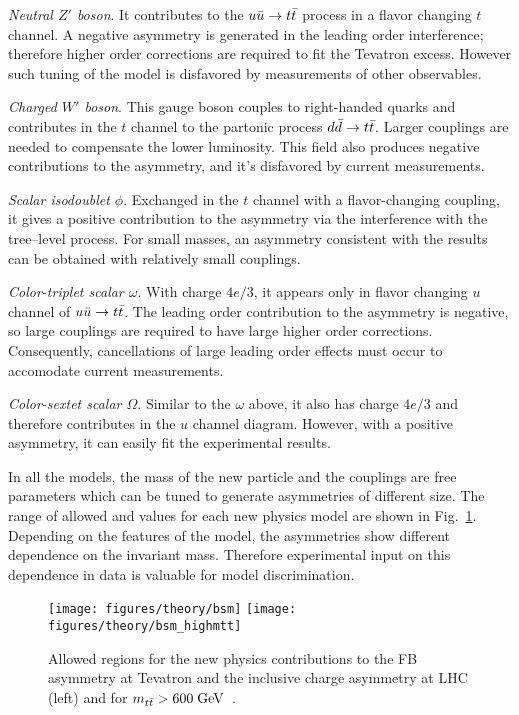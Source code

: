 {\em Neutral $Z'$ boson}. It contributes to the $u\bar{u}{}\to t\bar{t}{}$
process in a flavor changing $t$ channel. A negative asymmetry
is generated in the leading order interference; therefore higher order
corrections are required to fit the Tevatron excess. However such
tuning of the model is disfavored by measurements of other observables.

{\em Charged $W'$ boson}. This gauge boson couples to right-handed
quarks and contributes in the $t$ channel to the partonic process
$d\bar{d}{}\to t\bar{t}{}$. Larger couplings are needed to compensate the
lower \ddbar{} luminosity. This field also produces negative
contributions to the asymmetry, and it's disfavored by current measurements.

{\em Scalar isodoublet $\phi$}.
Exchanged in the $t$ channel with a flavor-changing coupling, it gives
a positive contribution to the asymmetry via the interference with the
tree--level process. For small masses, an asymmetry consistent with the
\afb{} results can be obtained with relatively small couplings.

{\em Color-triplet scalar $\omega$}.
With charge $4e/3$, it appears only in flavor changing $u$ channel of
$u\bar{u}{}\to t\bar{t}{}$. The leading order contribution to the asymmetry
is negative, so large couplings are required to have large higher
order corrections. Consequently, cancellations of large leading order
effects must occur to accomodate current measurements.

{\em Color-sextet scalar $\Omega$}.
Similar to the $\omega$ above, it also has charge $4e/3$ and therefore
contributes in the $u$ channel diagram. However, with a positive
asymmetry, it can easily fit the experimental results.

In all the models, the mass of the new particle and the couplings are
free parameters which can be tuned to generate asymmetries of
different size. The range of allowed \ac{} and \afb{} values for each
new physics model are shown in Fig.~\ref{fig:bsmmodels}. Depending on
the features of the model, the asymmetries show different dependence
on the \ttbar{} invariant mass. Therefore experimental input on this
dependence in data is valuable for model discrimination. 

\begin{figure}[!htb]
  \centering
  \texttt{[image: figures/theory/bsm]} 
  \texttt{[image: figures/theory/bsm\_highmtt]} 
  \caption{Allowed regions for the new physics contributions to the FB
    asymmetry at Tevatron and the inclusive charge asymmetry at LHC
    (left) and for $m_{t\bar{t}}{}>600 \; \mathrm{GeV}$~\cite{AguilarSaavedra:2011hz}.}
  \label{fig:bsmmodels}
\end{figure}


